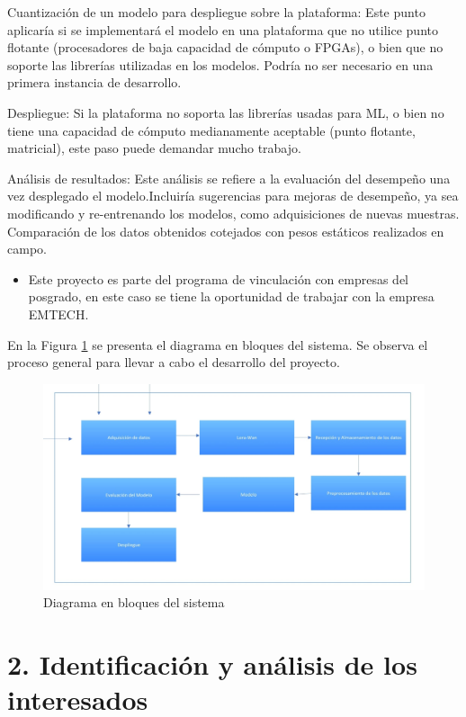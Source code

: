 \documentclass[
11pt, %
codirector, %
]{charter}
\begin{document}
Cuantización de un modelo para despliegue sobre la plataforma:
Este punto aplicaría si se implementará el modelo en una plataforma que no utilice punto flotante (procesadores de baja capacidad de cómputo o FPGAs), o bien que no soporte las librerías utilizadas en los modelos. Podría no ser necesario en una primera instancia de desarrollo.

Despliegue:
Si la plataforma no soporta las librerías usadas para ML, o bien no tiene una capacidad de cómputo medianamente aceptable (punto flotante, matricial), este paso puede demandar mucho trabajo.

Análisis de resultados:
Este análisis se refiere a la evaluación del desempeño una vez desplegado el modelo.Incluiría sugerencias para mejoras de desempeño, ya sea modificando y re-entrenando los modelos, como adquisiciones de nuevas muestras. Comparación de los datos obtenidos cotejados con pesos estáticos realizados en campo.


\begin{itemize}
	\item Este proyecto es parte del programa de vinculación con empresas del posgrado, en este caso se tiene la oportunidad de trabajar con la empresa EMTECH.
	
\end{itemize}

En la Figura \ref{fig:diagBloques} se presenta el diagrama en bloques del sistema. Se observa el proceso general para llevar a cabo el desarrollo del proyecto.

\begin{figure}[htpb]
\centering 
\includegraphics[width=.5\textwidth]{./Figuras/figura1.jpeg}
\caption{Diagrama en bloques del sistema}
\label{fig:diagBloques}
\end{figure}

\vspace{25px}



\section{2. Identificación y análisis de los interesados}
\label{sec:interesados}
\end{document}
